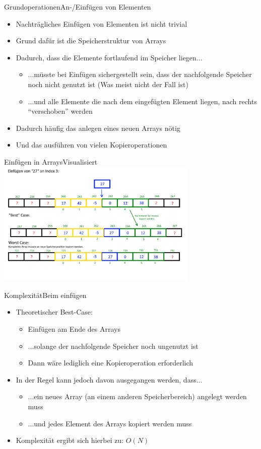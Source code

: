 \begin{frame}{Grundoperationen}{An-/Einfügen von Elementen}
	\begin{itemize}
		\item Nachträgliches Einfügen von Elementen ist nicht trivial
		\item Grund dafür ist die Speicherstruktur von Arrays
		\item Dadurch, dass die Elemente fortlaufend im Speicher liegen...
		\begin{itemize}
			\item ...müsste bei Einfügen sichergestellt sein, dass der nachfolgende Speicher noch nicht genutzt ist (Was meist nicht der Fall ist)
			\item ...und alle Elemente die nach dem eingefügten Element liegen, nach rechts "`verschoben"' werden
		\end{itemize}
		\item Dadurch häufig das anlegen eines neuen Arrays nötig
		\item Und das ausführen von vielen Kopieroperationen
	\end{itemize}
\end{frame}

\begin{frame}{Einfügen in Arrays}{Visualisiert}
\includegraphics[height=6cm]{graph/array_insert}
\end{frame}

\begin{frame}{Komplexität}{Beim einfügen}
	\begin{itemize}
		\item Theoretischer Best-Case:
		\begin{itemize}
			\item Einfügen am Ende des Arrays
			\item ...solange der nachfolgende Speicher noch ungenutzt ist
			\item Dann wäre lediglich eine Kopieroperation erforderlich
		\end{itemize}
		\item In der Regel kann jedoch davon ausgegangen werden, dass...
		\begin{itemize}
			\item ...ein neues Array (an einem anderen Speicherbereich) angelegt werden muss
			\item ...und jedes Element des Arrays kopiert werden muss
		\end{itemize}
		\item Komplexität ergibt sich hierbei zu: $O(N)$
	\end{itemize}
\end{frame}

